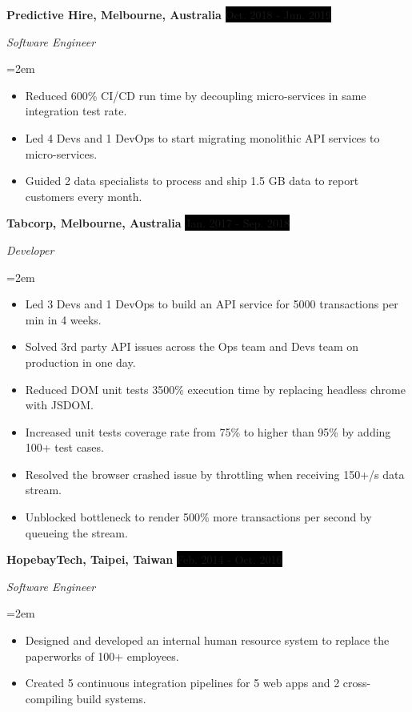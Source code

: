 \documentclass[a4paper, 11pt]{article}
\newcommand{\sepspace}{\vspace*{0.3em}}       %
\newcommand{\EducationEntry}[4]{
		\noindent \textbf{#1} \hfill      %
		\colorbox{White}{%
			\parbox{5cm}{%
			\hfill\color{Black}#2}} \par  %
		\noindent \textit{#3} \par        %
		\noindent\hangindent=2em\hangafter=0 \small #4 %
		\normalsize \par}
\newcommand{\WorkEntry}[4]{				  %
		\noindent \textbf{#1} \hfill      %
		\noindent\colorbox{Black}{\color{White}#2} \par  %
		\noindent \textit{#3} \par              %
		\noindent\hangindent=2em\hangafter=0 \small #4 %
		\normalsize \par}
\begin{document}
\WorkEntry{Predictive Hire, Melbourne, Australia}{Oct. 2018 - Jun. 2019}{Software Engineer}{
\begin{itemize}
	\item {Reduced 600\% CI/CD run time by decoupling micro-services in same integration test rate.}
	\item {Led 4 Devs and 1 DevOps to start migrating monolithic API services to micro-services.}
	\item {Guided 2 data specialists to process and ship 1.5 GB data to report customers every month.}
\end{itemize}
}

\sepspace

\WorkEntry{Tabcorp, Melbourne, Australia}{Jan. 2017 - Sep. 2018}{Developer}{
\begin{itemize}
	\item {Led 3 Devs and 1 DevOps to build an API service for 5000 transactions per min in 4 weeks.}
	\item {Solved 3rd party API issues across the Ops team and Devs team on production in one day.}
	\item {Reduced DOM unit tests 3500\% execution time by replacing headless chrome with JSDOM.}
	\item {Increased unit tests coverage rate from 75\% to higher than 95\% by adding 100+ test cases.}
	\item {Resolved the browser crashed issue by throttling when receiving 150+/s data stream.}
	\item {Unblocked bottleneck to render 500\% more transactions per second by queueing the stream.}
\end{itemize}
}

\sepspace

\WorkEntry{HopebayTech, Taipei, Taiwan}{Feb. 2014 - Oct. 2016}{Software Engineer}{
\begin{itemize}
	\item {Designed and developed an internal human resource system to replace the paperworks of 100+ employees.}
	\item {Created 5 continuous integration pipelines for 5 web apps and 2 cross-compiling build systems.}
\end{itemize}
}
\end{document}
